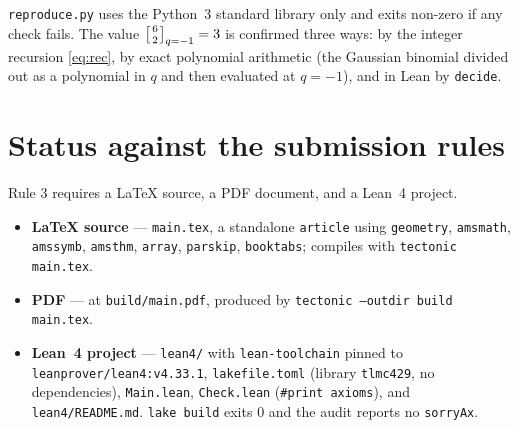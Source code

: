 \documentclass[11pt]{article}
\theoremstyle{definition}
\theoremstyle{remark}
\newcommand{\qbinm}[2]{\left[\genfrac{}{}{0pt}{}{#1}{#2}\right]_{q=-1}}
\begin{document}
\texttt{reproduce.py} uses the Python~3 standard library only and exits
non-zero if any check fails. The value $\qbinm{6}{2}=3$ is confirmed three
ways: by the integer recursion \eqref{eq:rec}, by exact polynomial arithmetic
(the Gaussian binomial divided out as a polynomial in $q$ and then evaluated at
$q=-1$), and in Lean by \texttt{decide}.

\section*{Status against the submission rules}

Rule 3 requires a LaTeX source, a PDF document, and a Lean~4 project.

\begin{itemize}
\item \textbf{LaTeX source} --- \texttt{main.tex}, a standalone \texttt{article}
  using \texttt{geometry}, \texttt{amsmath}, \texttt{amssymb}, \texttt{amsthm},
  \texttt{array}, \texttt{parskip}, \texttt{booktabs}; compiles with
  \texttt{tectonic main.tex}.
\item \textbf{PDF} --- at \texttt{build/main.pdf}, produced by
  \texttt{tectonic --outdir build main.tex}.
\item \textbf{Lean~4 project} --- \texttt{lean4/} with \texttt{lean-toolchain}
  pinned to \texttt{leanprover/lean4:v4.33.1}, \texttt{lakefile.toml}
  (library \texttt{tlmc429}, no dependencies), \texttt{Main.lean},
  \texttt{Check.lean} (\texttt{\#print axioms}), and \texttt{lean4/README.md}.
  \texttt{lake build} exits $0$ and the audit reports no \texttt{sorryAx}.
\end{itemize}
\end{document}

